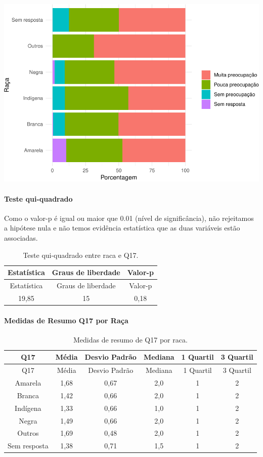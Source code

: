 \documentclass[]{article}
\let\oldparagraph\paragraph
\renewcommand{\paragraph}[1]{\oldparagraph{#1}\mbox{}}
\begin{document}
\begin{center}\includegraphics[width=0.75\linewidth]{relatorio_covid19_files/figure-latex/unnamed-chunk-221-1} \end{center}

\hypertarget{teste-qui-quadrado-20}{%
\paragraph{Teste qui-quadrado}\label{teste-qui-quadrado-20}}

Como o valor-p é igual ou maior que 0.01 (nível de significância), não rejeitamos a hipótese nula e não temos evidência estatística que as duas variáveis estão associadas.

\begin{longtable}[]{@{}ccc@{}}
\caption{\label{tab:unnamed-chunk-223}Teste qui-quadrado entre raca e Q17.}\tabularnewline
\toprule
Estatística & Graus de liberdade & Valor-p\tabularnewline
\midrule
\endfirsthead
\toprule
Estatística & Graus de liberdade & Valor-p\tabularnewline
\midrule
\endhead
19,85 & 15 & 0,18\tabularnewline
\bottomrule
\end{longtable}

\cleardoublepage

\hypertarget{medidas-de-resumo-q17-por-rauxe7a}{%
\paragraph{Medidas de Resumo Q17 por Raça}\label{medidas-de-resumo-q17-por-rauxe7a}}

\begin{longtable}[]{@{}cccccc@{}}
\caption{\label{tab:unnamed-chunk-224}Medidas de resumo de Q17 por raca.}\tabularnewline
\toprule
Q17 & Média & Desvio Padrão & Mediana & 1 Quartil & 3 Quartil\tabularnewline
\midrule
\endfirsthead
\toprule
Q17 & Média & Desvio Padrão & Mediana & 1 Quartil & 3 Quartil\tabularnewline
\midrule
\endhead
Amarela & 1,68 & 0,67 & 2,0 & 1 & 2\tabularnewline
Branca & 1,42 & 0,66 & 2,0 & 1 & 2\tabularnewline
Indígena & 1,33 & 0,66 & 1,0 & 1 & 2\tabularnewline
Negra & 1,49 & 0,66 & 2,0 & 1 & 2\tabularnewline
Outros & 1,69 & 0,48 & 2,0 & 1 & 2\tabularnewline
Sem resposta & 1,38 & 0,71 & 1,5 & 1 & 2\tabularnewline
\bottomrule
\end{longtable}
\end{document}
